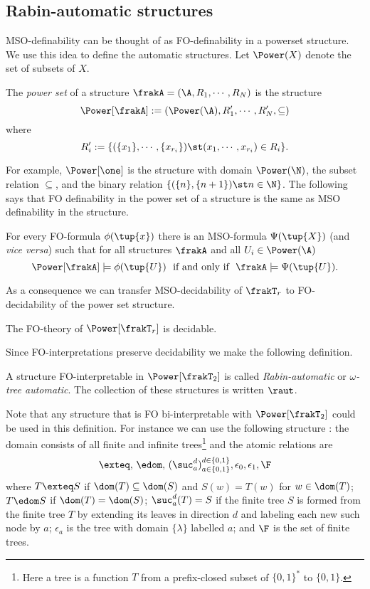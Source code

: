 \subsection{Rabin-automatic structures}

MSO-definability can be thought of as FO-definability in a powerset structure. We use this idea to define the automatic structures.
Let $\Power(X)$ denote the set of subsets of $X$. 

\begin{definition} \label{AS:dfn:powerset} \cite{CoLo07}
The {\em power set} of a structure $\frakA = ({\A},R_1,\cdots,R_N)$ is the structure
\[
\Power[\frakA] := (\Power({\A}),{R'_1}, \cdots,{R'_N}, \subseteq)
\]
where 
\[
 R'_i := \{ (\{x_1\},\cdots,\{x_{r_i}\}) \st (x_1,\cdots,x_{r_i}) \in R_i\}. 
\]
\end{definition}

For example, $\Power[\one]$ is the structure with domain $\Power(\N)$, the subset relation $\subseteq$, and the binary relation $\{(\{n\},\{n+1\}) \st n \in \N\}$.
The following says that FO definability in the power set of a structure is the same as MSO definability in the structure.

\begin{proposition} \label{AS:prop:translation}
For every FO-formula $\phi(\tup{x})$ there is an MSO-formula $\Psi(\tup{X})$ (and {\it vice versa}) such that for all structures $\frakA$ and all $U_i \in \Power({\A})$
\[
\Power[\frakA] \models \phi(\tup{U}) \ \mbox{ if and only if } \  \frakA \models \Psi(\tup{U}) .
\]
\end{proposition}

As a consequence we can transfer MSO-decidability of $\frakT_r$ to FO-decidability of the power set structure.
\begin{corollary}
The FO-theory of $\Power[\frakT_r]$ is decidable.
\end{corollary}

Since FO-interpretations preserve decidability we make the following definition.

\begin{definition} \label{AS:dfn:raut} \cite{Blum99}
A structure FO-interpretable in $\Power[\frakT_2]$ is called 
{\em Rabin-automatic} or {\em $\omega$-tree automatic}. The collection of these structures is written $\raut$.
\end{definition}

Note that any structure that is FO bi-interpretable with $\Power[\frakT_2]$ could be used in this definition. For instance we can use the following structure \cite{Blum99}:
the domain consists of all finite and infinite trees\footnote{Here a tree is a function $T$ from a prefix-closed subset of $\{0,1\}^\ast$ to $\{0,1\}$.}  and the atomic relations are
 \[
       \exteq, \, \edom,\,  (\suc_a^d)_{a \in \{0,1\}}^{d \in \{0,1\}},  \epsilon_0, \epsilon_1, \F 
 \]
where  $T \exteq S$ if $\dom(T) \subseteq \dom(S)$
and $S(w) = T(w)$ for $w \in \dom(T)$; $T \edom S$ if $\dom(T) = \dom(S)$;  $\suc_a^d(T) = S$ if the finite tree $S$ is formed from the finite tree $T$ by extending its leaves in direction $d$
and labeling each new such node by $a$; $\epsilon_a$ is the tree with domain $\{\lambda\}$ labelled $a$; and $\F$ is the set of finite trees.
 
